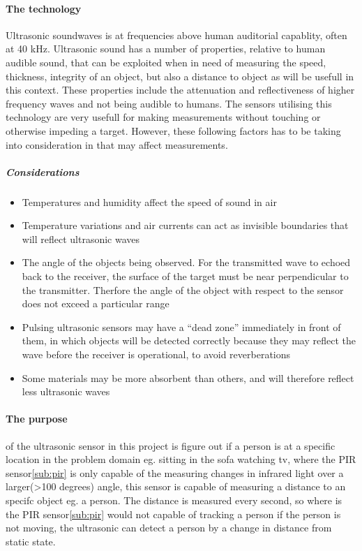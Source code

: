 \paragraph{The technology}
Ultrasonic soundwaves is at frequencies above human auditorial capablity, often at 40 kHz. Ultrasonic sound has a number of properties, relative to human audible sound, that can be exploited when in need of measuring the speed\cite{ultrasound}, thickness\cite{ultrasound2}, integrity\cite{ultrasound2} of an object, but also a distance to object as will be usefull in this context. These properties include the attenuation and reflectiveness of higher frequency waves and not being audible to humans. The sensors utilising this technology are very usefull for making measurements without touching or otherwise impeding a target. However, these following factors has to be taking into consideration in that may affect measurements.
  \subparagraph{Considerations}\label{sup:cons}
  \begin{itemize}
  \item Temperatures and humidity affect the speed of sound in air
  \item Temperature variations and air currents can act as invisible boundaries that will reflect ultrasonic waves
  \item The angle of the objects being observed. For the transmitted wave to echoed back to the receiver, the surface of the target must be  near perpendicular to the transmitter. Therfore the angle of the object with respect to the sensor does not exceed a particular range
  \item Pulsing ultrasonic sensors may have a “dead zone” immediately in front of them, in which objects will be detected correctly because they may reflect the wave before the receiver is operational, to avoid reverberations
  \item Some materials may be more absorbent than others, and will therefore reflect less ultrasonic waves
  \end{itemize}

\paragraph{The purpose} of the ultrasonic sensor in this project is figure out if a person is at a specific location in the problem domain eg. sitting in the sofa watching tv, where the PIR sensor\cref{sub:pir} is only capable of the measuring changes in infrared light over a larger(>100 degrees) angle, this sensor is capable of measuring a distance to an specifc object eg. a person. The distance is measured every second, so where is the PIR sensor\cref{sub:pir} would not capable of tracking a person if the person is not moving, the ultrasonic can detect a person by a change in distance from static state.

